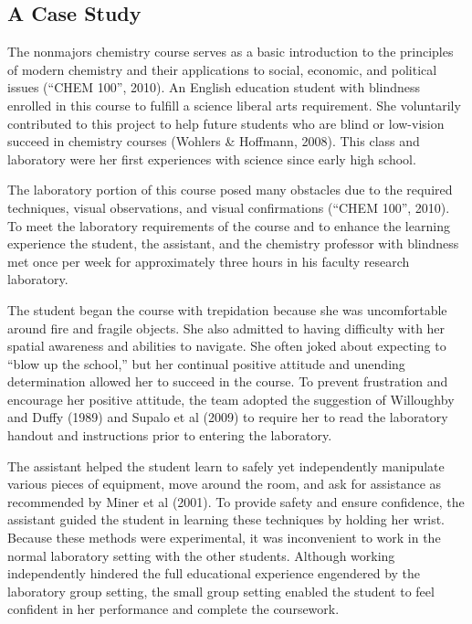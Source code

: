 \documentclass[11.5pt]{sig-alternate} %
\begin{document}
\begin{large}
\subsection*{A Case Study}

The nonmajors chemistry course serves as a basic introduction to the principles of modern chemistry and their applications to social, economic, and political issues (“CHEM 100”, 2010). An English education student with blindness enrolled in this course to fulfill a science liberal arts requirement. She voluntarily contributed to this project to help future students who are blind or low-vision succeed in chemistry courses (Wohlers \& Hoffmann, 2008). This class and laboratory were her first experiences with science since early high school. 

The laboratory portion of this course posed many obstacles due to the required techniques, visual observations, and visual confirmations (“CHEM 100”, 2010). To meet the laboratory requirements of the course and to enhance the learning experience the student, the assistant, and the chemistry professor with blindness met once per week for approximately three hours in his  faculty research laboratory. 

The student began the course with trepidation because she was uncomfortable around fire and fragile objects. She also admitted to having difficulty with her spatial awareness and abilities to navigate. She often joked about expecting to “blow up the school,” but her continual positive attitude and unending determination allowed her to succeed in the course. To prevent frustration and encourage her positive attitude, the team adopted the suggestion of Willoughby and Duffy (1989) and Supalo et al (2009) to require her to read the laboratory handout and instructions prior to entering the laboratory.

The assistant helped the student learn to safely yet independently manipulate various pieces of equipment, move around the room, and ask for assistance as recommended by Miner et al (2001). To provide safety and ensure confidence, the assistant guided the student in learning these techniques by holding her wrist. Because these methods were experimental, it was inconvenient to work in the normal laboratory setting with the other students. Although working independently hindered the full educational experience engendered by the laboratory group setting, the small group setting enabled the student to feel confident in her performance and complete the coursework. 


\end{large}
\end{document}
